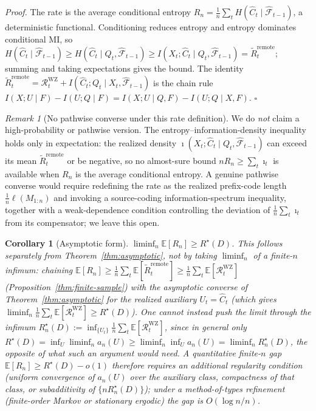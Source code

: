 \documentclass[11pt]{article}
\newcommand{\E}{\mathbb{E}}
\newcommand{\F}{\mathcal{F}}
\newcommand{\Fhat}{\hat{\F}}
\newcommand{\Chat}{\hat{C}}
\theoremstyle{plain}
\newtheorem{corollary}[theorem]{Corollary}
\theoremstyle{definition}
\theoremstyle{remark}
\newtheorem{remark}[theorem]{Remark}
\begin{document}
\noindent\emph{Proof.} The rate is the average conditional entropy
$R_n = \tfrac1n\sum_t H(\Chat_t\mid\Fhat_{t-1})$, a deterministic
functional. Conditioning reduces entropy and entropy dominates
conditional MI, so
$H(\Chat_t\mid\Fhat_{t-1}) \ge H(\Chat_t\mid Q_t,\Fhat_{t-1})
\ge I(X_t;\Chat_t\mid Q_t,\Fhat_{t-1}) = \widetilde R_t^{\mathrm{remote}}$;
summing and taking expectations gives the bound. The identity
$\widetilde R_t^{\mathrm{remote}} = \mathcal{R}_t^{\mathrm{WZ}}
+ I(\Chat_t;Q_t\mid X_t,\Fhat_{t-1})$ is the chain rule
$I(X;U\mid F)-I(U;Q\mid F) = I(X;U\mid Q,F)-I(U;Q\mid X,F)$.
\hfill$\square$

\begin{remark}[No pathwise converse under this rate definition]\label{rmk:pathwise-needs-codelen}
We do \emph{not} claim a high-probability or pathwise version. The
entropy--information-density inequality holds only in expectation: the
realized density $\imath(X_t;\Chat_t\mid Q_t,\Fhat_{t-1})$ can exceed
its mean $\widetilde R_t^{\mathrm{remote}}$ or be negative, so no
almost-sure bound $nR_n \ge \sum_t \imath_t$ is available when $R_n$ is
the average conditional entropy. A genuine pathwise converse would
require redefining the rate as the realized prefix-code length
$\tfrac1n\ell(M_{1:n})$ and invoking a source-coding
information-spectrum inequality, together with a weak-dependence
condition controlling the deviation of $\tfrac1n\sum_t\imath_t$ from
its compensator; we leave this open.
\end{remark}

\begin{corollary}[Asymptotic form]\label{cor:expectation-bound}
$\liminf_n \E[R_n] \ge R^\star(D)$. This follows \emph{separately} from
Theorem~\ref{thm:asymptotic}, not by taking $\liminf_n$ of a finite-$n$
infimum: chaining
$\E[R_n] \ge \tfrac1n\sum_t\E[\widetilde R_t^{\mathrm{remote}}]
\ge \tfrac1n\sum_t\E[\mathcal{R}_t^{\mathrm{WZ}}]$
(Proposition~\ref{thm:finite-sample}) with the asymptotic converse of
Theorem~\ref{thm:asymptotic} for the realized auxiliary $U_t=\Chat_t$
(which gives
$\liminf_n\tfrac1n\sum_t\E[\mathcal{R}_t^{\mathrm{WZ}}]\ge R^\star(D)$).
One cannot instead push the limit through the infimum
$R_n^\star(D):=\inf_{\{U_t\}}\tfrac1n\sum_t\E[\mathcal{R}_t^{\mathrm{WZ}}]$,
since in general only
$R^\star(D)=\inf_U\liminf_n a_n(U)\ge\liminf_n\inf_U a_n(U)=\liminf_n R_n^\star(D)$,
the opposite of what such an argument would need. A quantitative
finite-$n$ gap $\E[R_n]\ge R^\star(D)-o(1)$ therefore requires an
additional regularity condition (uniform convergence of $a_n(U)$ over
the auxiliary class, compactness of that class, or subadditivity of
$\{nR_n^\star(D)\}$); under a method-of-types refinement (finite-order
Markov or stationary ergodic) the gap is $O(\log n/n)$.
\end{corollary}
\end{document}
